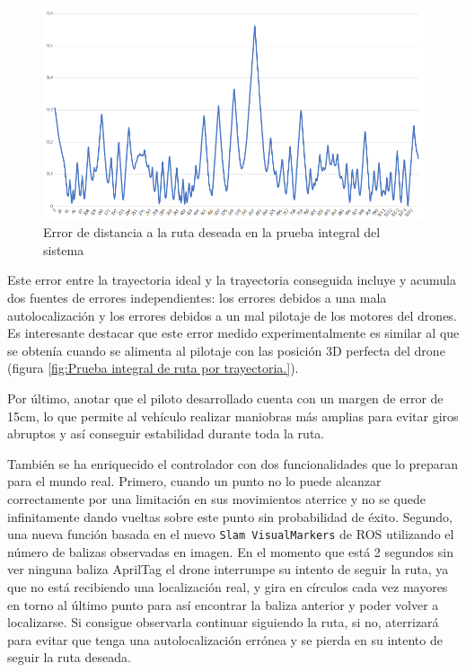 \begin{figure}[H]
	\begin{center}
		\includegraphics[width=1\textwidth]{imag/IMG44.png}
				\caption{Error de distancia a la ruta deseada en la prueba integral del sistema}
		\label{fig:Error de distancia final.}	
	\end{center}
\end{figure}


\hspace{1cm} Este error entre la trayectoria ideal y la trayectoria conseguida incluye y acumula dos fuentes de errores independientes: los errores debidos a una mala autolocalización y los errores debidos a un mal pilotaje de los motores del drones. Es interesante destacar que este error medido experimentalmente es similar al que se obtenía cuando se alimenta al pilotaje con las posición 3D perfecta del drone (figura \ref{fig:Prueba integral de ruta por trayectoria.}).

\hspace{1cm} Por último, anotar que el piloto desarrollado cuenta con un margen de error de 15cm, lo que permite al vehículo realizar maniobras más amplias para evitar giros abruptos y así conseguir estabilidad durante toda la ruta. 

\hspace{1cm} También se ha enriquecido el controlador con dos funcionalidades que lo preparan para el mundo real. Primero, cuando un punto no lo puede alcanzar correctamente por una limitación en sus movimientos aterrice y no se quede infinitamente dando vueltas sobre este punto sin probabilidad de éxito. Segundo, una nueva función basada en el nuevo \texttt{Slam VisualMarkers} de ROS utilizando el número de balizas observadas en imagen. En el momento que está 2 segundos sin ver ninguna baliza AprilTag el drone interrumpe su intento de seguir la ruta, ya que no está recibiendo una localización real, y gira en círculos cada vez mayores en torno al último punto para así encontrar la baliza anterior y poder volver a localizarse. Si consigue observarla continuar siguiendo la ruta, si no, aterrizará para evitar que tenga una autolocalización errónea y se pierda en su intento de seguir la ruta deseada.